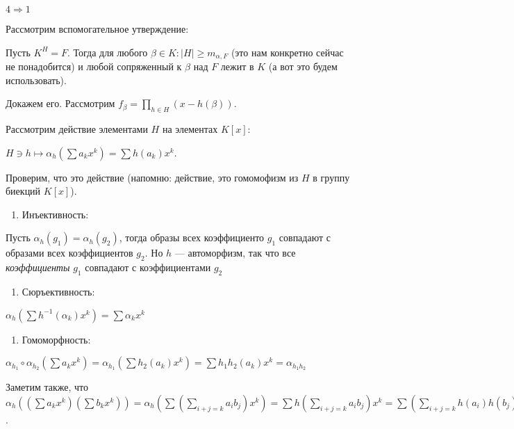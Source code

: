 \(4 \Rightarrow 1\)

\hypertarget{9.1.useful.statement}{Рассмотрим вспомогательное утверждение:}

Пусть \(K^H = F\). Тогда для любого \(\beta \in K: |H| \geqslant m_{\alpha, F}\) (это нам конкретно сейчас не понадобится) и любой сопряженный к \(\beta\) над \(F\) лежит в \(K\) (а вот это будем использовать).

Докажем его. Рассмотрим \(f_\beta = {\displaystyle \prod_{h \in H}(x - h(\beta))}\).

Рассмотрим действие элементами \(H\) на элементах \(K[x]:\)

\(H \ni h \mapsto \alpha_h(\sum a_k x^k) = \sum h(a_k) x^k\).

Проверим, что это действие (напомню: действие, это гомомофизм из \(H\) в группу биекций \(K[x]\)).

\begin{enumerate}
\def\labelenumi{\arabic{enumi})}
\tightlist
\item
  Инъективность:
\end{enumerate}

Пусть \(\alpha_h(g_1) = \alpha_h(g_2)\), тогда образы всех коэффициенто \(g_1\) совпадают с образами всех коэффициентов \(g_2\). Но \(h\) --- автоморфизм, так что все \textit{коэффициенты} \(g_1\) совпадают с коэффициентами \(g_2\)

\begin{enumerate}
\def\labelenumi{\arabic{enumi})}
\setcounter{enumi}{1}
\tightlist
\item
  Сюръективность:
\end{enumerate}

\(\alpha_h(\sum h^{-1}(\alpha_k) x^k) = \sum \alpha_kx^k\)

\begin{enumerate}
\def\labelenumi{\arabic{enumi})}
\setcounter{enumi}{2}
\tightlist
\item
  Гомоморфность:
\end{enumerate}

\(\alpha_{h_1} \circ \alpha_{h_2}(\sum a_k x^k) = \alpha_{h_1}(\sum h_2(a_k) x^k) = \sum h_1 h_2 (a_k) x^k = \alpha_{h_1 h_2}\)

Заметим также, что \(\alpha_h((\sum a_k x^k)(\sum b_kx^k)) = \alpha_h(\sum (\sum\limits_{i + j = k} a_ib_j)x^k) = \sum h(\sum\limits_{i + j = k} a_ib_j)x^k = \sum (\sum\limits_{i + j = k} h(a_i)h(b_j)) x^k = (\sum h(a_k)x^k)(\sum h(b_k)x^k) = \alpha_h(\sum a_kx^k)\alpha_h(\sum b_kx^k)\).

